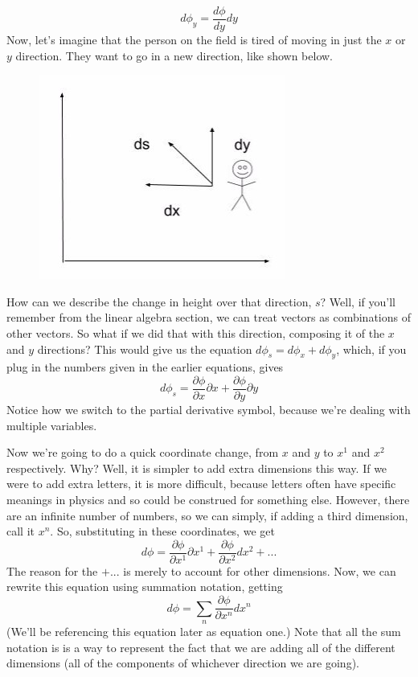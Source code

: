 \begin{equation*}
d\phi_y=\frac{d\phi}{dy}dy
\end{equation*}
Now, let's imagine that the person on the field is tired of moving in just the $x$ or $y$ direction. They want to go in a new direction, like shown below.
\begin{figure}[H]
\includegraphics[scale=0.5]{sdir.jpg}
\end{figure}
How can we describe the change in height over that direction, $s$? Well, if you'll remember from the linear algebra section, we can treat vectors as combinations of other vectors. So what if we did that with this direction, composing it of the $x$ and $y$ directions?
This would give us the equation $d\phi_s=d\phi_x+d\phi_y$, which, if you plug in the numbers given in the earlier equations, gives
\begin{equation*}
d\phi_s=\frac{\partial\phi}{\partial x}\partial x+\frac{\partial\phi}{\partial y}\partial y
\end{equation*}
Notice how we switch to the partial derivative symbol, because we're dealing with multiple variables.

Now we're going to do a quick coordinate change, from $x$ and $y$ to $x^1$ and $x^2$ respectively. Why? Well, it is simpler to add extra dimensions this way. If we were to add extra letters, it is more difficult, because letters often have specific meanings in physics and so could be construed for something else. However, there are an infinite number of numbers, so we can simply, if adding a third dimension, call it $x^n$. So, substituting in these coordinates, we get
\begin{equation*}
    d\phi= \frac{\partial \phi}{\partial x^1}\partial x^1+\frac{\partial\phi}{\partial x^2}dx^2+...
\end{equation*}
The reason for the $+...$ is merely to account for other dimensions. Now, we can rewrite this equation using summation notation, getting
\begin{equation}
    d\phi=\sum\limits_n\frac{\partial\phi}{\partial x^n}dx^n
\end{equation}
(We'll be referencing this equation later as equation one.) Note that all the sum notation is is a way to represent the fact that we are adding all of the different dimensions (all of the components of whichever direction we are going).

